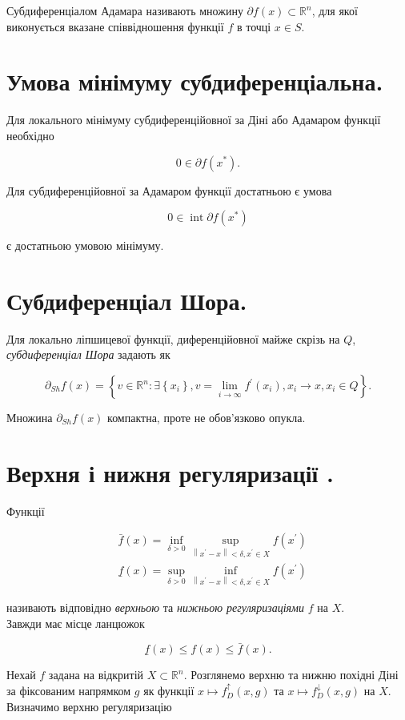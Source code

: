 \documentclass[12pt,a4paper]{extarticle}
\numberwithin{section}{part}
\begin{document}
Субдиференціалом Адамара називають множину $\partial f(x) \subset \mathbb{R}^{n}$, для якої виконується вказане співвідношення функції $f$ в точці $x \in S$.

\section{Умова мінімуму субдиференціальна.}
Для локального мінімуму субдиференційовної за Діні або Адамаром функції необхідно

$$
0 \in \partial f\left(x^{*}\right) .
$$

Для субдиференційовної за Адамаром функції достатньою є умова

$$
0 \in \operatorname{int} \partial f\left(x^{*}\right)
$$

є достатньою умовою мінімуму.

\section{Субдиференціал Шора.}
Для локально ліпшицевої функції, диференційовної майже скрізь на $Q$, \textit{субдиференціал Шора} задають як

$$
\partial_{S h} f(x)=\left\{v \in \mathbb{R}^{n}: \exists\left\{x_{i}\right\}, v=\lim _{i \rightarrow \infty} f^{\prime}\left(x_{i}\right), x_{i} \rightarrow x, x_{i} \in Q\right\} .
$$

Множина $\partial_{S h} f(x)$ компактна, проте не обов'язково опукла.

\section{Верхня і нижня регуляризації .}
Функції

$$
\begin{aligned}
& \bar{f}(x)=\inf _{\delta>0} \sup _{\left\|x^{\prime}-x\right\|<\delta, x^{\prime} \in X} f\left(x^{\prime}\right) \\
& \underline{f}(x)=\sup _{\delta>0} \inf _{\left\|x^{\prime}-x\right\|<\delta, x^{\prime} \in X} f\left(x^{\prime}\right)
\end{aligned}
$$

називають відповідно \textit{верхньою} та \textit{нижньою регуляризаціями} $f$ на $X$.\\
Завжди має місце ланцюжок

$$
\underline{f}(x) \leq f(x) \leq \bar{f}(x) .
$$

Нехай $f$ задана на відкритій $X \subset \mathbb{R}^{n}$. Розглянемо верхню та нижню похідні Діні за фіксованим напрямком $g$ як функції $x \mapsto f_{D}^{\uparrow}(x, g)$ та $x \mapsto f_{D}^{\downarrow}(x, g)$ на $X$.\\
Визначимо верхню регуляризацію
\end{document}
